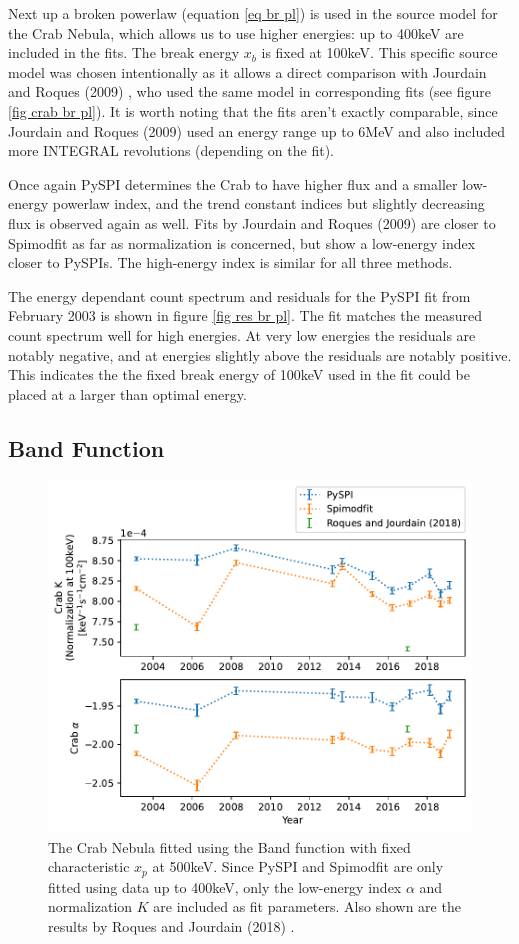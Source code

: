 \documentclass{report}
\begin{document}
Next up a broken powerlaw (equation \ref{eq br pl}) is used in the source model for the Crab Nebula, which allows us to use higher energies: up to 400keV are included in the fits. The break energy $x_b$ is fixed at 100keV. This specific source model was chosen intentionally as it allows a direct comparison with Jourdain and Roques (2009) \cite{2009ApJ...704...17J}, who used the same model in corresponding fits (see figure \ref{fig crab br pl}). It is worth noting that the fits aren't exactly comparable, since  Jourdain and Roques (2009) \cite{2009ApJ...704...17J} used an energy range up to 6MeV and also included more INTEGRAL revolutions (depending on the fit).

Once again PySPI determines the Crab to have higher flux and a smaller low-energy powerlaw index, and the trend constant indices but slightly decreasing flux is observed again as well. Fits by Jourdain and Roques (2009) \cite{2009ApJ...704...17J} are closer to Spimodfit as far as normalization is concerned, but show a low-energy index closer to PySPIs. The high-energy index is similar for all three methods.

The energy dependant count spectrum and residuals for the PySPI fit from February 2003 is shown in figure \ref{fig res br pl}. The fit matches the measured count spectrum well for high energies. At very low energies the residuals are notably negative, and at energies slightly above the residuals are notably positive. This indicates the the fixed break energy of 100keV used in the fit could be placed at a larger than optimal energy.



\FloatBarrier

\subsection{Band Function}

\begin{figure}[h]
  \centering
  \includegraphics[width=.65\textwidth]{Images/Crab_Fits/crab_c_band.pdf}
  \caption{The Crab Nebula fitted using the Band function with fixed characteristic $x_p$ at 500keV. Since PySPI and Spimodfit are only fitted using data up to 400keV, only the low-energy index $\alpha$ and normalization $K$ are included as fit parameters. Also shown are the results by Roques and Jourdain (2018) \cite{Roques}.}
  \label{fit crab c band}
\end{figure}
\end{document}
